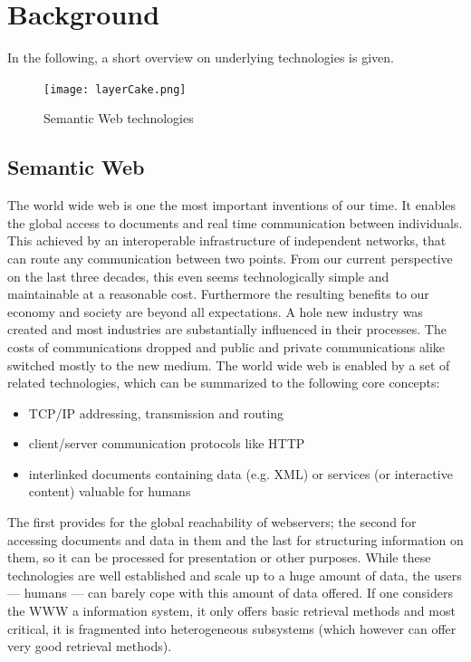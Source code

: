 \section{Background}
\label{sec:basics}

In the following, a short overview on underlying technologies is given. 
\begin{figure}
  \centering
    \texttt{[image: layerCake.png]}
  \caption{Semantic Web technologies}
  \label{fig:layercake}
\end{figure}

\subsection{Semantic Web}
The world wide web is one the most important inventions of our time. 
It enables the global access to documents and real time communication between individuals.
This achieved by an interoperable infrastructure of independent networks, that can route any communication between two points.
From our current perspective on the last three decades, this even seems technologically simple and maintainable at a reasonable cost.
Furthermore the resulting benefits to our economy and society are beyond all expectations. A hole new industry was created and most industries are substantially influenced in their processes.
The costs of communications dropped and public and private communications alike switched mostly to the new medium.
The world wide web is enabled by a set of related technologies, which can be summarized to the following core concepts:
\begin{itemize}
\item TCP/IP addressing, transmission and routing
\item client/server communication protocols like HTTP
\item interlinked documents containing data (e.g. XML) or services (or interactive content) valuable for humans
\end{itemize}
The first provides for the global reachability of webservers; the second for accessing documents and data in them and the last for structuring information on them, so it can be processed for presentation or other purposes.
While these technologies are well established and scale up to a huge amount of data, the users --- humans --- can barely cope with this amount of data offered. 
If one considers the WWW a information system, it only offers basic retrieval methods and most critical, it is fragmented into heterogeneous subsystems (which however can offer very good retrieval methods). 

